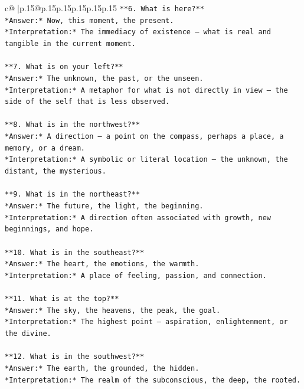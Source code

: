 \documentclass{article}
\begin{document}
{\begin{supertabular}{c@{$\;$}|p{.15\linewidth}@{}p{.15\linewidth}p{.15\linewidth}p{.15\linewidth}p{.15\linewidth}p{.15\linewidth}}
{{{\texttt{**6. What is here?**  } \\
\texttt{*Answer:* Now, this moment, the present.  } \\
\texttt{*Interpretation:* The immediacy of existence — what is real and tangible in the current moment.} \\
\\ 
\texttt{**7. What is on your left?**  } \\
\texttt{*Answer:* The unknown, the past, or the unseen.  } \\
\texttt{*Interpretation:* A metaphor for what is not directly in view — the side of the self that is less observed.} \\
\\ 
\texttt{**8. What is in the northwest?**  } \\
\texttt{*Answer:* A direction — a point on the compass, perhaps a place, a memory, or a dream.  } \\
\texttt{*Interpretation:* A symbolic or literal location — the unknown, the distant, the mysterious.} \\
\\ 
\texttt{**9. What is in the northeast?**  } \\
\texttt{*Answer:* The future, the light, the beginning.  } \\
\texttt{*Interpretation:* A direction often associated with growth, new beginnings, and hope.} \\
\\ 
\texttt{**10. What is in the southeast?**  } \\
\texttt{*Answer:* The heart, the emotions, the warmth.  } \\
\texttt{*Interpretation:* A place of feeling, passion, and connection.} \\
\\ 
\texttt{**11. What is at the top?**  } \\
\texttt{*Answer:* The sky, the heavens, the peak, the goal.  } \\
\texttt{*Interpretation:* The highest point — aspiration, enlightenment, or the divine.} \\
\\ 
\texttt{**12. What is in the southwest?**  } \\
\texttt{*Answer:* The earth, the grounded, the hidden.  } \\
\texttt{*Interpretation:* The realm of the subconscious, the deep, the rooted.} \\
\\ 
}}}
\end{supertabular}}
\end{document}
